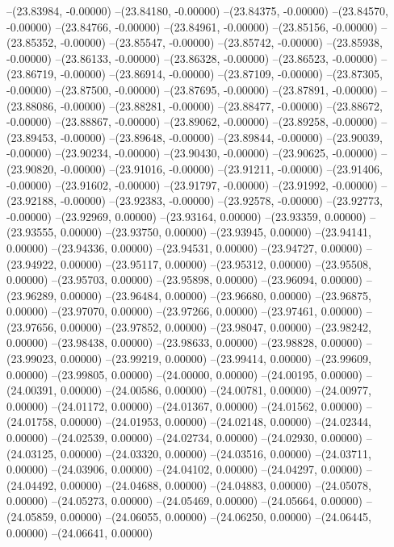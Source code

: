--(23.83984, -0.00000)
--(23.84180, -0.00000)
--(23.84375, -0.00000)
--(23.84570, -0.00000)
--(23.84766, -0.00000)
--(23.84961, -0.00000)
--(23.85156, -0.00000)
--(23.85352, -0.00000)
--(23.85547, -0.00000)
--(23.85742, -0.00000)
--(23.85938, -0.00000)
--(23.86133, -0.00000)
--(23.86328, -0.00000)
--(23.86523, -0.00000)
--(23.86719, -0.00000)
--(23.86914, -0.00000)
--(23.87109, -0.00000)
--(23.87305, -0.00000)
--(23.87500, -0.00000)
--(23.87695, -0.00000)
--(23.87891, -0.00000)
--(23.88086, -0.00000)
--(23.88281, -0.00000)
--(23.88477, -0.00000)
--(23.88672, -0.00000)
--(23.88867, -0.00000)
--(23.89062, -0.00000)
--(23.89258, -0.00000)
--(23.89453, -0.00000)
--(23.89648, -0.00000)
--(23.89844, -0.00000)
--(23.90039, -0.00000)
--(23.90234, -0.00000)
--(23.90430, -0.00000)
--(23.90625, -0.00000)
--(23.90820, -0.00000)
--(23.91016, -0.00000)
--(23.91211, -0.00000)
--(23.91406, -0.00000)
--(23.91602, -0.00000)
--(23.91797, -0.00000)
--(23.91992, -0.00000)
--(23.92188, -0.00000)
--(23.92383, -0.00000)
--(23.92578, -0.00000)
--(23.92773, -0.00000)
--(23.92969, 0.00000)
--(23.93164, 0.00000)
--(23.93359, 0.00000)
--(23.93555, 0.00000)
--(23.93750, 0.00000)
--(23.93945, 0.00000)
--(23.94141, 0.00000)
--(23.94336, 0.00000)
--(23.94531, 0.00000)
--(23.94727, 0.00000)
--(23.94922, 0.00000)
--(23.95117, 0.00000)
--(23.95312, 0.00000)
--(23.95508, 0.00000)
--(23.95703, 0.00000)
--(23.95898, 0.00000)
--(23.96094, 0.00000)
--(23.96289, 0.00000)
--(23.96484, 0.00000)
--(23.96680, 0.00000)
--(23.96875, 0.00000)
--(23.97070, 0.00000)
--(23.97266, 0.00000)
--(23.97461, 0.00000)
--(23.97656, 0.00000)
--(23.97852, 0.00000)
--(23.98047, 0.00000)
--(23.98242, 0.00000)
--(23.98438, 0.00000)
--(23.98633, 0.00000)
--(23.98828, 0.00000)
--(23.99023, 0.00000)
--(23.99219, 0.00000)
--(23.99414, 0.00000)
--(23.99609, 0.00000)
--(23.99805, 0.00000)
--(24.00000, 0.00000)
--(24.00195, 0.00000)
--(24.00391, 0.00000)
--(24.00586, 0.00000)
--(24.00781, 0.00000)
--(24.00977, 0.00000)
--(24.01172, 0.00000)
--(24.01367, 0.00000)
--(24.01562, 0.00000)
--(24.01758, 0.00000)
--(24.01953, 0.00000)
--(24.02148, 0.00000)
--(24.02344, 0.00000)
--(24.02539, 0.00000)
--(24.02734, 0.00000)
--(24.02930, 0.00000)
--(24.03125, 0.00000)
--(24.03320, 0.00000)
--(24.03516, 0.00000)
--(24.03711, 0.00000)
--(24.03906, 0.00000)
--(24.04102, 0.00000)
--(24.04297, 0.00000)
--(24.04492, 0.00000)
--(24.04688, 0.00000)
--(24.04883, 0.00000)
--(24.05078, 0.00000)
--(24.05273, 0.00000)
--(24.05469, 0.00000)
--(24.05664, 0.00000)
--(24.05859, 0.00000)
--(24.06055, 0.00000)
--(24.06250, 0.00000)
--(24.06445, 0.00000)
--(24.06641, 0.00000)
